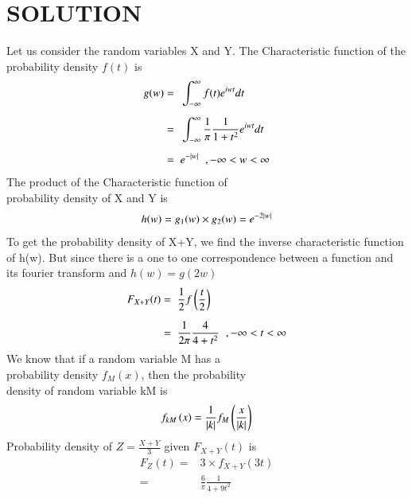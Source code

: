 \documentclass[journal,12pt,twocolumn]{IEEEtran}
\begin{document}
    \section*{SOLUTION}
    Let us consider the random variables X and Y.
    The Characteristic function of the probability density $f(t)$ is
    \begin{align}
        g(w) =\hspace{0.2cm} & \int_{-\infty}^{\infty}  f(t) {e}^{iwt} dt                                         \\[0.2cm]
        =\hspace{0.2cm}      & \int_{-\infty}^{\infty}  \displaystyle\frac{1}{\pi} \frac{1}{1+{t}^2} {e}^{iwt} dt \\[0.2cm]
        =\hspace{0.2cm}      & e^{-\vert w\vert}\hspace{0.2cm}, -\infty<w<\infty
    \end{align}
    The product of the Characteristic function of \\probability density of X and Y is
    \begin{align}
        h(w) = g_1(w) \times g_2(w) = {e}^{-2\vert w\vert}
    \end{align}
    To get the probability density of X+Y, we find the inverse characteristic function of h(w). But since there is a one to one correspondence between a function and its fourier transform and
$h(w) = g(2w)$
    \begin{align}
        F_{X+Y}(t) =\hspace{0.2cm} & \frac{1}{2}f\left(\frac{t}{2}\right)                                        \\[0.2cm]
        =\hspace{0.2cm}            & \frac{1}{2\pi} \frac{4}{4+{t}^2} \hspace{0.2cm},-\infty<t<\infty
    \end{align}
    We know that if a random variable M has a\\probability density $f_M(x)$, then the probability \\density of random variable kM is
    \begin{align}
        f_{kM}\left(x\right) = \frac{1}{\vert k\vert} f_M\left(\frac{x}{\vert k\vert}\right)
    \end{align}
    Probability density of $Z = \displaystyle\frac{X+Y}{3}$ given $F_{X+Y}(t)$ is
\begin{align}
    F_{Z}(t) = & 3\times \displaystyle f_{X+Y}(3t) \\
    =          & \frac{6}{\pi} \frac{1}{4+9{t}^2}
\end{align}
\end{document}
